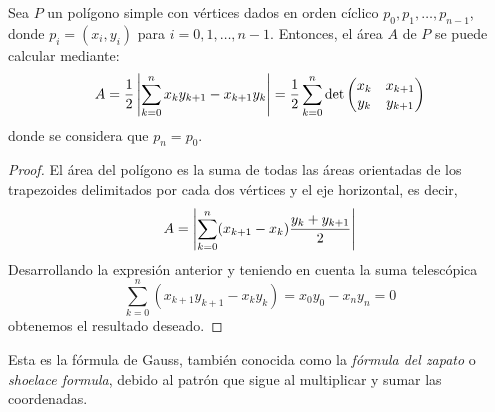 \documentclass[a4paper,12pt]{article}
\begin{document}
\begin{thm}
    Sea $P$ un polígono simple con vértices dados en orden cíclico $p_0, p_1, \dots, p_{n-1}$, donde $p_i = (x_i, y_i)$ para $i = 0, 1, \dots, n-1$. Entonces, el área $A$ de $P$ se puede calcular mediante:
    $$A=\frac{1}{2}\left| \sum_{k=0}^nx_ky_{k+1} - x_{k+1}y_k\right|=\frac{1}{2}\sum_{k=0}^n\det\begin{pmatrix}
        x_k & x_{k+1} \\
        y_k & y_{k+1}
    \end{pmatrix}$$
    donde se considera que $p_n = p_0$.
\end{thm}

\begin{proof}
    El área del polígono es la suma de todas las áreas orientadas de los trapezoides delimitados por cada dos vértices y el eje horizontal, es decir,
    $$A=\left| \sum_{k=0}^n(x_{k+1}-x_k)\frac{y_k+y_{k+1}}{2}\right|$$
    Desarrollando la expresión anterior y teniendo en cuenta la suma telescópica
    $$\sum_{k=0}^n(x_{k+1}y_{k+1}-x_ky_k)=x_0y_0-x_ny_n=0$$
    obtenemos el resultado deseado.
\end{proof}
Esta es la fórmula de Gauss, también conocida como la \textit{fórmula del zapato} o \textit{shoelace formula}, debido al patrón que sigue al multiplicar y sumar las coordenadas.
\end{document}

